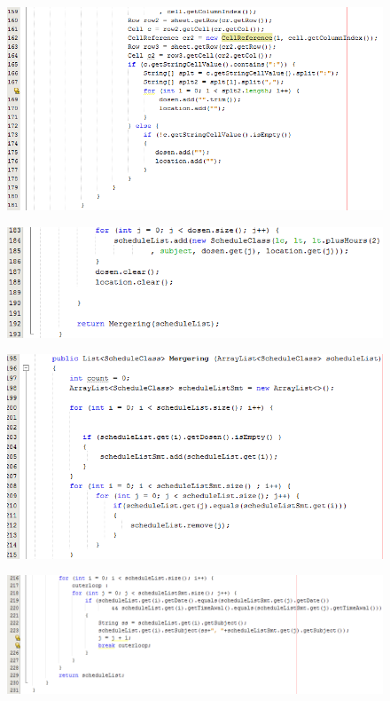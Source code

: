 \begin{enumerate}
\begin{figure}[H]
		\end{figure}
		\begin{figure}[H]
		\includegraphics[scale=0.8]{Gambar/excelConverter5}
		\end{figure}
		\begin{figure}[H]
		\includegraphics[scale=0.8]{Gambar/excelConverter6}
		\end{figure}
		\begin{figure}[H]
		\includegraphics[scale=0.8]{Gambar/excelConverter7}
		\end{figure}
		\begin{figure}[H]
		\includegraphics[scale=0.7]{Gambar/excelConverter8}

\end{figure}
\end{enumerate}
